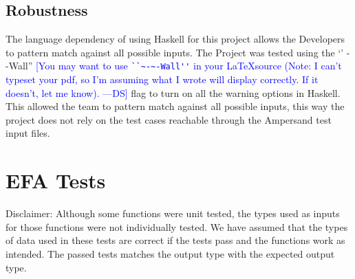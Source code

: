 \documentclass[12pt, svgnames]{article}
\newcommand{\authornote}[3]{\textcolor{#1}{[#3 ---#2]}}
\newcommand{\authornote}[3]{}
\newcommand{\ds}[1]{\authornote{blue}{DS}{#1}}
\begin{document}
\subsection{Robustness}
The language dependency of using Haskell for this project allows the Developers to pattern match against all possible inputs. The Project was tested using the `' - -Wall''
\ds{You may want to use \verb|``~-~-Wall''| in your \LaTeX source 
(Note: I can't typeset your pdf, so I'm assuming what I wrote will display correctly. 
If it doesn't, let me know).}
flag to turn on all the warning options in Haskell. This allowed the team to pattern match against all possible inputs, this way the project does not rely on the test cases reachable through the Ampersand test input files. 

\section{EFA Tests}
Disclaimer: Although some functions were unit tested, the types used as inputs 
for those functions were not individually tested. We have assumed that the 
types of data used in these tests are correct if the tests pass and the 
functions work as intended. The passed tests matches the output type with the 
expected output type.
\end{document}
